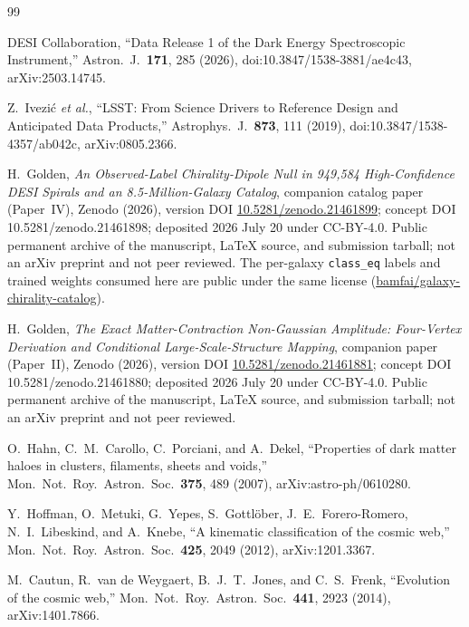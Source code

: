 \documentclass[twocolumn,linenumbers]{aastex702}
\begin{document}
\begin{thebibliography}{99}

DESI Collaboration, ``Data Release 1 of the Dark Energy Spectroscopic
Instrument,'' Astron.\ J.\ \textbf{171}, 285 (2026),
doi:10.3847/1538-3881/ae4c43, arXiv:2503.14745.

Z.~Ivezi\'c \textit{et al.}, ``LSST: From Science Drivers to Reference
Design and Anticipated Data Products,'' Astrophys.\ J.\ \textbf{873},
111 (2019), doi:10.3847/1538-4357/ab042c, arXiv:0805.2366.

H.~Golden,
\emph{An Observed-Label Chirality-Dipole Null in 949,584 High-Confidence DESI
Spirals and an 8.5-Million-Galaxy Catalog}, companion catalog paper
(Paper~IV), Zenodo (2026), version DOI
\href{https://doi.org/10.5281/zenodo.21461899}{10.5281/zenodo.21461899};
concept DOI 10.5281/zenodo.21461898; deposited 2026 July 20 under CC-BY-4.0.
Public permanent archive of the manuscript, \LaTeX{} source, and submission
tarball; not an arXiv preprint and not peer reviewed.
The per-galaxy \texttt{class\_eq} labels and trained weights consumed here are
public under the same license (\href{https://huggingface.co/datasets/bamfai/galaxy-chirality-catalog}{bamfai/galaxy-chirality-catalog}).

H.~Golden,
\emph{The Exact Matter-Contraction Non-Gaussian Amplitude: Four-Vertex
Derivation and Conditional Large-Scale-Structure Mapping}, companion paper
(Paper~II), Zenodo (2026), version DOI
\href{https://doi.org/10.5281/zenodo.21461881}{10.5281/zenodo.21461881};
concept DOI 10.5281/zenodo.21461880; deposited 2026 July 20 under CC-BY-4.0.
Public permanent archive of the manuscript, \LaTeX{} source, and submission
tarball; not an arXiv preprint and not peer reviewed.

O.~Hahn, C.~M.~Carollo, C.~Porciani, and A.~Dekel,
``Properties of dark matter haloes in clusters, filaments, sheets and
voids,'' Mon.\ Not.\ Roy.\ Astron.\ Soc.\ \textbf{375}, 489 (2007),
arXiv:astro-ph/0610280.

Y.~Hoffman, O.~Metuki, G.~Yepes, S.~Gottl\"ober, J.~E.~Forero-Romero,
N.~I.~Libeskind, and A.~Knebe,
``A kinematic classification of the cosmic web,''
Mon.\ Not.\ Roy.\ Astron.\ Soc.\ \textbf{425}, 2049 (2012),
arXiv:1201.3367.

M.~Cautun, R.~van de Weygaert, B.~J.~T.~Jones, and C.~S.~Frenk,
``Evolution of the cosmic web,''
Mon.\ Not.\ Roy.\ Astron.\ Soc.\ \textbf{441}, 2923 (2014),
arXiv:1401.7866.


\end{thebibliography}
\end{document}
